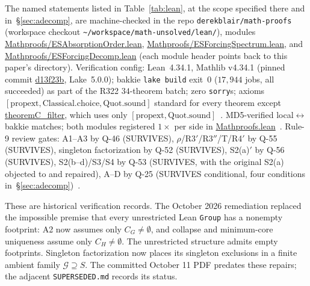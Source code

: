 \documentclass[11pt,a4paper]{article}
\theoremstyle{definition}
\begin{document}
The named statements listed in Table~\ref{tab:lean}, at the scope specified
there and in~\S\ref{sec:adecomp}, are machine-checked in the repo
\texttt{derekblair/math-proofs} (workspace checkout
\texttt{\textasciitilde/workspace/math-unsolved/lean/}), modules
\url{Mathproofs/ESAbsorptionOrder.lean},
\url{Mathproofs/ESForcingSpectrum.lean}, and
\url{Mathproofs/ESForcingDecomp.lean} (each module header points back to
this paper's directory).  Verification config: Lean~4.34.1, Mathlib v4.34.1
(pinned commit \url{d13f23b}, Lake~5.0.0); bakkie
\texttt{lake build} exit~$0$ ($17{,}944$ jobs, all succeeded) as part of the
R322 $34$-theorem batch; zero \texttt{sorry}s; axioms
$[\mathrm{propext},\mathrm{Classical.choice},\mathrm{Quot.sound}]$ standard
for every theorem except \url{theoremC_filter}, which uses only
$[\mathrm{propext},\mathrm{Quot.sound}]$~\cite{D322}.  MD5-verified
local$\leftrightarrow$bakkie matches; both modules registered $1\times$ per
side in \url{Mathproofs.lean}~\cite{D322}.  Rule-9 review gates:
A1--A3 by Q-46 (SURVIVES), $\rho$/R3$'$/R3$''$/T/R4$'$ by Q-55 (SURVIVES),
singleton factorization by Q-52 (SURVIVES), S2(a)$'$ by Q-56 (SURVIVES),
S2(b--d)/S3/S4 by Q-53 (SURVIVES, with the original S2(a) objected to and
repaired), A--D by Q-25 (SURVIVES conditional, four conditions
in~\S\ref{sec:adecomp})~\cite{D314,D315,D316,D322}.

These are historical verification records. The October 2026 remediation
replaced the impossible premise that every unrestricted Lean \texttt{Group}
has a nonempty footprint: A2 now assumes only $C_G\ne\emptyset$, and
collapse and minimum-core uniqueness assume only $C_H\ne\emptyset$.
The unrestricted structure admits empty footprints. Singleton factorization
now places its singleton exclusions in a finite ambient family
$\mathcal G\supseteq S$. The committed October 11 PDF predates these repairs;
the adjacent \texttt{SUPERSEDED.md} records its status.
\end{document}
